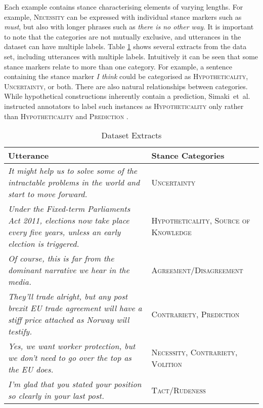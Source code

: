\documentclass[Dissertation.tex]{subfiles}
\begin{document}
Each example contains stance characterising elements of varying lengths. For example, {\small\scshape Necessity} can be expressed with individual stance markers such as \textit{must}, but also with longer phrases such as \textit{there is no other way}. It is important to note that the categories are not mutually exclusive, and utterances in the dataset can have multiple labels. Table \ref{tab:dataExtracts} shows several extracts from the data set, including utterances with multiple labels. Intuitively it can be seen that some stance markers relate to more than one category. For example, a sentence containing the stance marker \textit{I think} could be categorised as {\small \scshape Hypotheticality}, {\small \scshape Uncertainty}, or both. There are also natural relationships between categories. While hypothetical constructions inherently contain a prediction, Simaki~et~al. instructed annotators to label such instances as {\small \scshape Hypotheticality} only rather than {\small \scshape Hypotheticality} and {\small \scshape Prediction} \cite{simakiAnnotatingSpeakerStance2017}.


{\renewcommand{\arraystretch}{1.5}
	\centering
\begin{table}[]
	\begin{tabularx}{\textwidth}{>{\raggedright}X >{\raggedright \arraybackslash}p{5cm}}
		\toprule
		Utterance 											& Stance Categories \\ \midrule
		\itshape It might help us to solve some of the intractable problems in the world and start to move forward. &\small\scshape Uncertainty \\
		\itshape Under the Fixed-term Parliaments Act 2011, elections now take place every five years, unless an early election is triggered. &\small\scshape  Hypotheticality, Source of Knowledge \\
		\itshape Of course, this is far from the dominant narrative we hear in the media. & \small\scshape Agreement/Disagreement \\
		\itshape They’ll trade alright, but any post brexit EU trade agreement will have a stiff price attached as Norway will testify. &\small\scshape  Contrariety, Prediction\\
		\itshape Yes, we want worker protection, but we don’t need to go over the top as the EU does. & \small\scshape Necessity, Contrariety, Volition\\
		\itshape I’m glad that you stated your position so clearly in your last post. &\small\scshape  Tact/Rudeness
		 \\\bottomrule
		
	\end{tabularx}
\caption{Dataset Extracts
\label{tab:dataExtracts}}
\end{table}}
\end{document}
